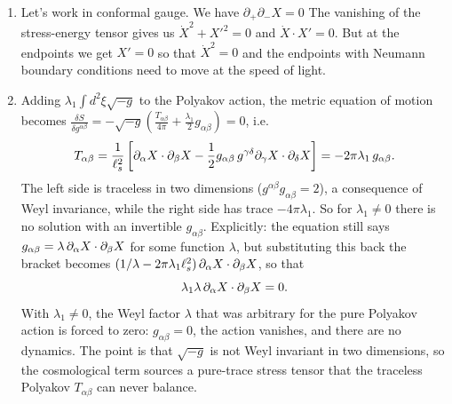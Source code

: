 \documentclass[11pt, class=article, crop=false]{standalone}
\begin{document}
\begin{enumerate}
		\item %
		Let's work in conformal gauge. We have $\partial_+ \partial_- X = 0$
		The vanishing of the stress-energy tensor gives us $\dot X^2 + {X'}^2 = 0$ and $\dot X \cdot X' = 0$. But at the endpoints we get $X' = 0$ so that $\dot X^2 = 0$ and the endpoints with Neumann boundary conditions need to move at the speed of light.
		
		\item Adding $\lambda_1 \int d^2\xi \sqrt{-g}$ to the Polyakov action, the metric equation of motion becomes $\frac{\delta S}{\delta g^{\alpha \beta}} = -\sqrt{-g} \left(\frac{T_{\alpha \beta}}{4 \pi} + \frac{\lambda_1}{2} g_{\alpha \beta}\right) = 0$, i.e.
		\begin{equation}
			T_{\alpha \beta} = \frac{1}{\ell_s^2}\left[\partial_\alpha X \cdot \partial_\beta X - \frac12 g_{\alpha \beta}\, g^{\gamma \delta} \partial_\gamma X \cdot \partial_\delta X\right] = -2 \pi \lambda_1\, g_{\alpha \beta}.
		\end{equation}
		The left side is traceless in two dimensions ($g^{\alpha \beta} g_{\alpha \beta} = 2$), a consequence of Weyl invariance, while the right side has trace $-4 \pi \lambda_1$. So for $\lambda_1 \neq 0$ there is no solution with an invertible $g_{\alpha \beta}$. Explicitly: the equation still says $g_{\alpha \beta} = \lambda\, \partial_\alpha X \cdot \partial_\beta X$ for some function $\lambda$, but substituting this back the bracket becomes $(1/\lambda - 2 \pi \lambda_1 \ell_s^2)\, \partial_\alpha X \cdot \partial_\beta X$, so that
		\begin{equation}
			\lambda_1 \lambda\, \partial_\alpha X \cdot \partial_\beta X = 0.
		\end{equation}
		With $\lambda_1 \neq 0$, the Weyl factor $\lambda$ that was arbitrary for the pure Polyakov action is forced to zero: $g_{\alpha \beta} = 0$, the action vanishes, and there are no dynamics. The point is that $\sqrt{-g}$ is not Weyl invariant in two dimensions, so the cosmological term sources a pure-trace stress tensor that the traceless Polyakov $T_{\alpha \beta}$ can never balance.
		

\end{enumerate}
\end{document}
